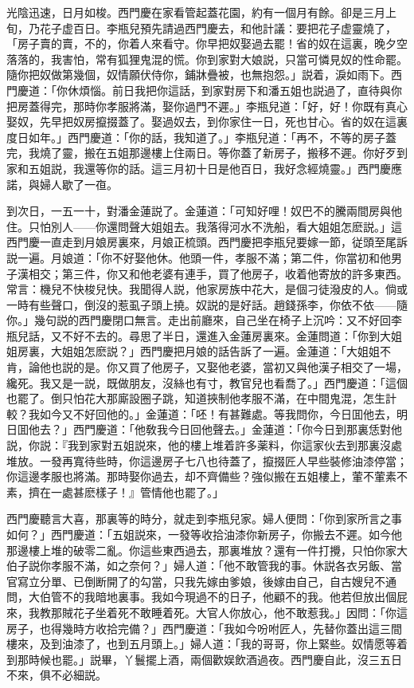 光陰迅速，日月如梭。西門慶在家看管起蓋花園，約有一個月有餘。卻是三月上旬，乃花子虚百日。李瓶兒預先請過西門慶去，和他計議：要把花子虚靈燒了，「房子賣的賣，不的，你着人來看守。你早把奴娶過去罷！省的奴在這裏，晚夕空落落的，我害怕，常有狐狸鬼混的慌。你到家對大娘説，只當可憐見奴的性命罷。隨你把奴做第幾個，奴情願伏侍你，鋪牀疊被，也無抱怨。」説着，淚如雨下。西門慶道：「你休煩惱。前日我把你這話，到家對房下和潘五姐也説過了，直待與你把房蓋得完，那時你孝服將滿，娶你過門不遲。」李瓶兒道：「好，好！你既有真心娶奴，先早把奴房攛掇蓋了。娶過奴去，到你家住一日，死也甘心。省的奴在這裏度日如年。」西門慶道：「你的話，我知道了。」李瓶兒道：「再不，不等的房子蓋完，我燒了靈，搬在五姐那邊樓上住兩日。等你蓋了新房子，搬移不遲。你好歹到家和五姐説，我還等你的話。這三月初十日是他百日，我好念經燒靈。」西門慶應諾，與婦人歇了一亱。

到次日，一五一十，對潘金蓮説了。金蓮道：「可知好哩！奴巴不的騰兩間房與他住。只怕別人——你還問聲大姐姐去。我落得河水不洗船，看大姐姐怎麽説。」這西門慶一直走到月娘房裏來，月娘正梳頭。西門慶把李瓶兒要嫁一節，従頭至尾訴説一遍。月娘道：「你不好娶他休。他頭一件，孝服不滿；第二件，你當初和他男子漢相交；第三件，你又和他老婆有連手，買了他房子，收着他寄放的許多東西。常言：機兒不快梭兒快。我聞得人説，他家房族中花大，是個刁徒潑皮的人。倘或一時有些聲口，倒沒的惹虱子頭上撓。奴説的是好話。趙錢孫李，你依不依——隨你。」幾句説的西門慶閉口無言。走出前廳來，自己坐在椅子上沉吟：又不好回李瓶兒話，又不好不去的。尋思了半日，還進入金蓮房裏來。金蓮問道：「你到大姐姐房裏，大姐姐怎麽説？」西門慶把月娘的話告訴了一遍。金蓮道：「大姐姐不肯，論他也説的是。你又買了他房子，又娶他老婆，當初又與他漢子相交了一場，纔死。我又是一説，既做朋友，沒絲也有寸，教官兒也看喬了。」西門慶道：「這個也罷了。倒只怕花大那廝設圈子跳，知道挾制他孝服不滿，在中間鬼混，怎生計較？我如今又不好回他的。」金蓮道：「呸！有甚難處。等我問你，今日囬他去，明日囬他去？」西門慶道：「他敎我今日回他聲去。」金蓮道：「你今日到那裏恁對他説，你説：『我到家對五姐説來，他的樓上堆着許多薬料，你這家伙去到那裏沒處堆放。一發再寬待些時，你這邊房子七八也待蓋了，攛掇匠人早些裝修油漆停當；你這邊孝服也將滿。那時娶你過去，却不齊備些？強似搬在五姐樓上，葷不葷素不素，擠在一處甚麽樣子！』管情他也罷了。」

西門慶聽言大喜，那裏等的時分，就走到李瓶兒家。婦人便問：「你到家所言之事如何？」西門慶道：「五姐説來，一發等收拾油漆你新房子，你搬去不遲。如今他那邊樓上堆的破零二亂。你這些東西過去，那裏堆放？還有一件打攪，只怕你家大伯子説你孝服不滿，如之奈何？」婦人道：「他不敢管我的事。休説各衣另飯、當官寫立分單、已倒断開了的勾當，只我先嫁由爹娘，後嫁由自己，自古嫂兒不通問，大伯管不的我暗地裏事。我如今現過不的日子，他顧不的我。他若但放出個屁來，我教那賊花子坐着死不敢睡着死。大官人你放心，他不敢惹我。」因問：「你這房子，也得幾時方收拾完備？」西門慶道：「我如今吩咐匠人，先替你蓋出這三間樓來，及到油漆了，也到五月頭上。」婦人道：「我的哥哥，你上緊些。奴情愿等着到那時候也罷。」説畢，丫鬟擺上酒，兩個歡娱飲酒過夜。西門慶自此，沒三五日不來，俱不必細説。

